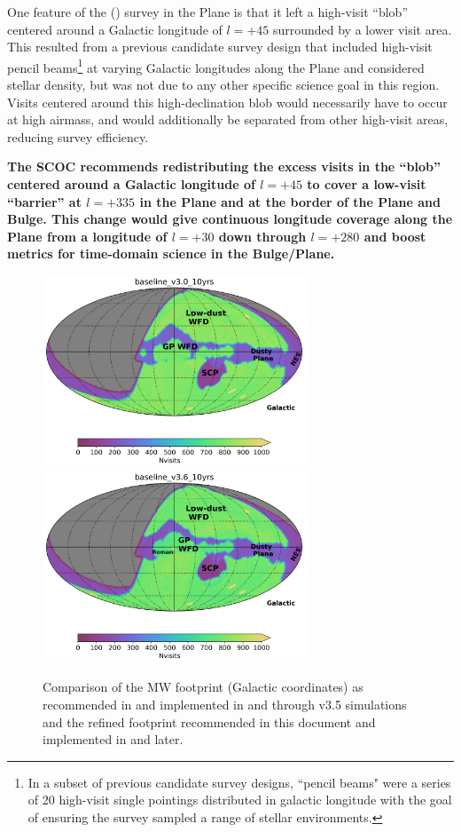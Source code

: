 One feature of the  () survey in the Plane is that it left a high-visit ``blob'' centered around a Galactic longitude of $l=+45$ surrounded by a lower visit area. This resulted from a previous candidate survey design that included high-visit pencil beams\footnote{In a subset of previous candidate survey designs, ``pencil beams" were a series of 20 high-visit single pointings distributed in galactic longitude with the goal of ensuring the survey sampled a range of stellar environments.} at varying Galactic longitudes along the Plane and considered stellar density, but was not due to any other specific science goal in this region. Visits centered around this high-declination blob would necessarily have to occur at high airmass, and would additionally be separated from other high-visit areas, reducing survey efficiency.

{\bf The SCOC recommends redistributing the excess visits in the ``blob'' centered around a Galactic longitude of $l=+45$ to cover a low-visit ``barrier'' at $l=+335$ in the Plane and at the border of the Plane and Bulge. This change would give continuous longitude coverage along the Plane from a longitude of $l=+30$ down through $l=+280$ and boost metrics for time-domain science in the Bulge/Plane.}


\begin{figure}
\centering
    \includegraphics[width=0.7\textwidth]{figures/baseline_v3_0_10yrs_nvisits_galactic.png}
    \includegraphics[width=0.7\textwidth]{figures/baseline_v3_6_10yrs_nvisits_galactic.png}
    \caption{Comparison of the MW footprint (Galactic coordinates) as recommended in  and implemented in  and through v3.5 simulations and the refined footprint recommended in this document and implemented in  and later.}
\end{figure}

